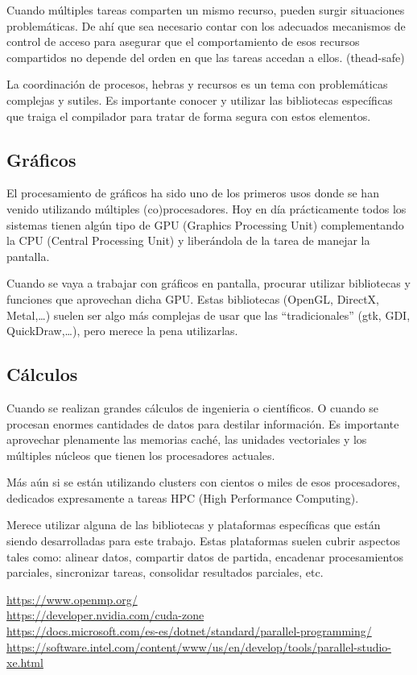 \documentclass[spanish,12pt,a4paper,final,oneside]{book}
\begin{document}
Cuando múltiples tareas comparten un mismo recurso, pueden surgir situaciones problemáticas. De ahí que sea necesario contar con los adecuados mecanismos de control de acceso para asegurar que el comportamiento de esos recursos compartidos no depende del orden en que las tareas accedan a ellos. (thead-safe)

La coordinación de procesos, hebras y recursos es un tema con problemáticas complejas y sutiles. Es importante conocer y utilizar las bibliotecas específicas que traiga el compilador para tratar de forma segura con estos elementos.

\subsection{Gráficos}
El procesamiento de gráficos ha sido uno de los primeros usos donde se han venido utilizando múltiples (co)procesadores. Hoy en día prácticamente todos los sistemas tienen algún tipo de GPU (Graphics Processing Unit) complementando la CPU (Central Processing Unit) y liberándola de la tarea de manejar la pantalla. 

Cuando se vaya a trabajar con gráficos en pantalla, procurar utilizar bibliotecas y funciones que aprovechan dicha GPU. Estas bibliotecas (OpenGL, DirectX, Metal,\ldots) suelen ser algo más complejas de usar que las ``tradicionales'' (gtk, GDI, QuickDraw,\ldots), pero merece la pena utilizarlas.


\subsection{Cálculos}
Cuando se realizan grandes cálculos de ingenieria o científicos. O cuando se procesan enormes cantidades de datos para destilar información. Es importante aprovechar plenamente las memorias caché, las unidades vectoriales y los múltiples núcleos que tienen los procesadores actuales. 

Más aún si se están utilizando clusters con cientos o miles de esos procesadores, dedicados expresamente a tareas HPC (High Performance Computing). 

Merece utilizar alguna de las bibliotecas y plataformas específicas que están siendo desarrolladas para este trabajo. Estas plataformas suelen cubrir aspectos tales como: alinear datos, compartir datos de partida, encadenar procesamientos parciales, sincronizar tareas, consolidar resultados parciales, etc.

\begin{scriptsize}
\url{https://www.openmp.org/}
\\ \url{https://developer.nvidia.com/cuda-zone}
\\ \url{https://docs.microsoft.com/es-es/dotnet/standard/parallel-programming/}
\\ \url{https://software.intel.com/content/www/us/en/develop/tools/parallel-studio-xe.html}
\end{scriptsize}
\end{document}
